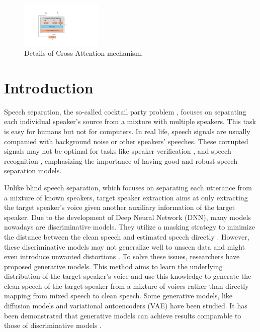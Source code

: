 \documentclass[conference]{IEEEtran}
\begin{document}
    \begin{figure}
        \centering
        \includegraphics[width=0.35\textwidth]{assets/cross_attention.pdf}
        \caption{Details of Cross Attention mechanism.}
        \label{cross_attention}
        \end{figure}


        
\section{Introduction}
Speech separation, the so-called cocktail party problem \cite{cocktail}, focuses on separating each individual speaker's source from a mixture with multiple speakers. This task is easy for humans but not for computers. 
In real life, speech signals are usually companied with background noise or other speakers' speeches. 
These corrupted signals may not be optimal for tasks like speaker verification \cite{rao2019targetspeakerextractionoverlapped,9414017}, and speech recognition \cite{molkov2017SpeakerAwareNN, 8462661}, emphasizing the importance of having good and robust 
speech separation models.

Unlike blind speech separation, which focuses on separating each utterance from a mixture 
of known speakers, target speaker extraction aims at only extracting the 
target speaker's voice given another auxiliary information of the target speaker. Due to the 
development of Deep Neural Network (DNN), many models nowadays are discriminative models. They 
utilize a masking strategy to minimize the distance between the clean speech and estimated 
speech directly \cite{luo2019conv,spex_plus,sepformer,sef_net}. However, these discriminative 
models may not generalize well to unseen data and might even introduce unwanted distortions \cite{distortion}. To solve these issues, researchers have proposed generative models. This method aims to learn the underlying distribution of the target speaker's voice and use this knowledge to generate the clean speech of the target speaker from a mixture of voices rather 
than directly mapping from mixed speech to clean speech. Some generative models, like diffusion
models \cite{target_diff} and variational autoencoders (VAE) \cite{vae} have been studied. It has been demonstrated that generative models can achieve results comparable to those of discriminative models \cite{target_diff,tokensplit}.
\end{document}
